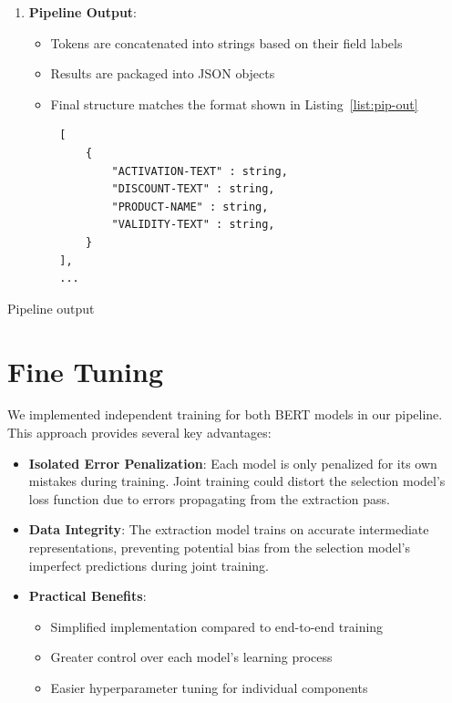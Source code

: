 \documentclass[licencjacka,en]{pracamgr}
\begin{document}
\begin{enumerate}
    \item \textbf{Pipeline Output}:
    \begin{itemize}
        \item Tokens are concatenated into strings based on their field labels
        \item Results are packaged into JSON objects
        \item Final structure matches the format shown in Listing~\ref{list:pip-out}
    \end{itemize}
\end{enumerate}
\begin{center}
   \begin{listing}
        \begin{verbatim}
        [
            {
                "ACTIVATION-TEXT" : string,
                "DISCOUNT-TEXT" : string,
                "PRODUCT-NAME" : string,
                "VALIDITY-TEXT" : string,
            }
        ],
        ...
        \end{verbatim}
        \caption{Pipeline output}
        \label{list:pip-out}
    \end{listing}
\end{center}

\section{Fine Tuning}
We implemented independent training for both BERT models in our pipeline. This approach provides several key advantages:

\begin{itemize}
    \item \textbf{Isolated Error Penalization}: Each model is only penalized for its own mistakes during training. Joint training could distort the selection model's loss function due to errors propagating from the extraction pass.

    \item \textbf{Data Integrity}: The extraction model trains on accurate intermediate representations, preventing potential bias from the selection model's imperfect predictions during joint training.

    \item \textbf{Practical Benefits}:
    \begin{itemize}
        \item Simplified implementation compared to end-to-end training
        \item Greater control over each model's learning process
        \item Easier hyperparameter tuning for individual components
    \end{itemize}
\end{itemize}
\end{document}
